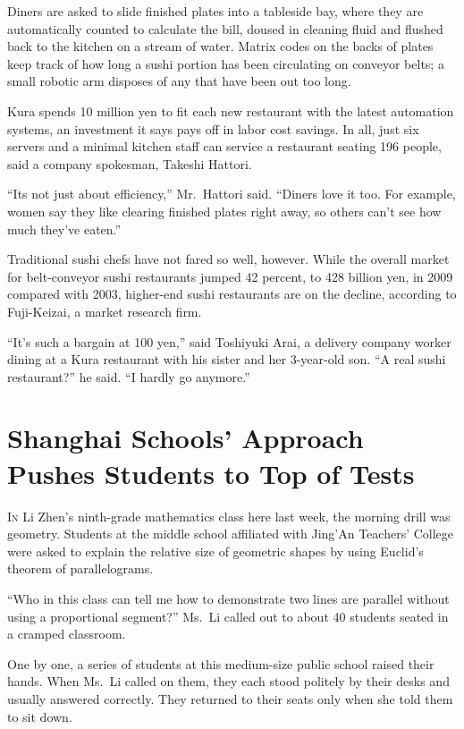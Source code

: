 ﻿\documentclass[12pt]{article}
\begin{document}
Diners are asked to slide finished plates into a tableside bay, where they are automatically counted
to calculate the bill, doused in cleaning fluid and flushed back to the kitchen on a stream of
water. Matrix codes on the backs of plates keep track of how long a sushi portion has been
circulating on conveyor belts; a small robotic arm disposes of any that have been out too long.

Kura spends 10 million yen to fit each new restaurant with the latest automation systems, an
investment it says pays off in labor cost savings. In all, just six servers and a minimal kitchen
staff can service a restaurant seating 196 people, said a company spokesman, Takeshi Hattori.

``Its not just about efficiency,'' Mr.~Hattori said. ``Diners love it too. For example, women say
they like clearing finished plates right away, so others can't see how much they've eaten.''

Traditional sushi chefs have not fared so well, however. While the overall market for belt-conveyor
sushi restaurants jumped 42 percent, to 428 billion yen, in 2009 compared with 2003, higher-end
sushi restaurants are on the decline, according to Fuji-Keizai, a market research firm.

``It's such a bargain at 100 yen,'' said Toshiyuki Arai, a delivery company worker dining at a Kura
restaurant with his sister and her 3-year-old son. ``A real sushi restaurant?'' he said. ``I hardly
go anymore.''

\section{Shanghai Schools' Approach Pushes Students to Top of Tests}

\lettrine{I}{n} Li Zhen's ninth-grade mathematics class here last week, the
morning drill was geometry. Students at the middle school affiliated with Jing'An Teachers' College
were asked to explain the relative size of geometric shapes by using Euclid's theorem of
parallelograms.

``Who in this class can tell me how to demonstrate two lines are parallel without using a
proportional segment?'' Ms.~Li called out to about 40 students seated in a cramped classroom.

One by one, a series of students at this medium-size public school raised their hands. When Ms.~Li
called on them, they each stood politely by their desks and usually answered correctly. They
returned to their seats only when she told them to sit down.
\end{document}
